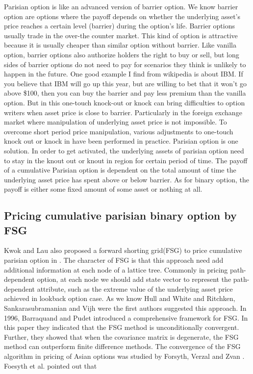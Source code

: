 \documentclass[12pt,oneside,titlepage]{book}
\begin{document}
Parisian option is like an advanced version of barrier option. We know barrier option are options where the payoff depends on whether the underlying asset's price reaches a certain level (barrier) during the option's life. Barrier options usually trade in the over-the counter market. This kind of option is attractive because it is usually cheaper than similar option without barrier. Like vanilla option, barrier options also authorize holders the right to buy or sell, but  long sides of barrier options do not need to pay for scenarios they think is unlikely to happen in the future. One good example I find from wikipedia is about IBM. If you believe that IBM will go up this year, but are willing to bet that it won't go above \$100, then you can buy the barrier and pay less premium than the vanilla option. But in this one-touch knock-out or knock can bring difficulties to option writers when asset price is close to barrier. Particularly in the foreign exchange market where manipulation of underlying asset price is not impossible. To overcome short period price manipulation, various adjustments to one-touch knock out or knock in have been performed in practice. Parisian option is one solution.  In order to get activated, the underlying assets of parisian option need to stay in the knout out or knout in region for certain period of time. The payoff of a cumulative Parisian option is dependent on the total amount of time the underlying asset price has spent above or below barrier. As for binary option, the payoff is either some fixed amount of some asset or nothing at all.

\subsection{Pricing cumulative parisian binary option by FSG}
Kwok and Lau also proposed a forward shorting grid(FSG) to price cumulative parisian option in \cite{Kwok2001}. The character of FSG is that this approach need add additional information at each node of  a lattice tree. Commonly in pricing path-dependent option, at each node we should add state vector to represent the path-dependent attribute, such as the extreme value of the underlying asset price achieved in lookback option case. As we know Hull and White \cite{Hull1993} and Ritchken, Sankarasubramanian and Vijh \cite{Vijh1993} were the first authors suggested this approach. In 1996, Barraquand and Pudet \cite{Barraquand1996} introduced a comprehensive framework for FSG. In this paper they indicated that the FSG method is unconditionally convergent. Further, they showed that when the covariance matrix is degenerate, the FSG method can outperform finite difference methods. The convergence of the FSG algorithm in pricing of Asian options was studied by Forsyth, Verzal and Zvan \cite{Forsyth1999}. Foesyth et al. pointed out that
\end{document}
